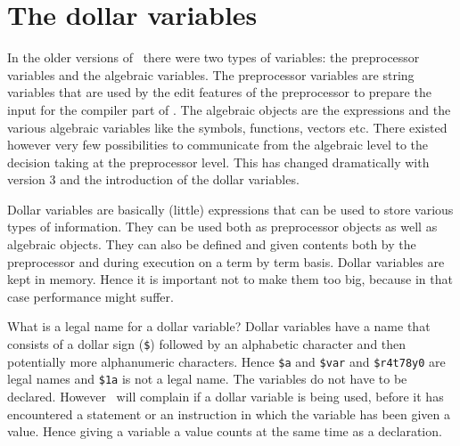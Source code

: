 
\chapter{The dollar variables}
\label{dollars}

In the older versions of \FORM\ there were two types of variables: the 
preprocessor variables and the algebraic 
variables. The preprocessor 
variables are string variables that are used by the edit features of the 
preprocessor to prepare the input for the compiler part of \FORM\@. The 
algebraic objects are the expressions and the various algebraic variables 
like the symbols, functions, vectors etc. There existed however very few 
possibilities to communicate from the algebraic level to the decision 
taking at the preprocessor level. This has changed dramatically with 
version 3 and the introduction of the dollar 
variables.

Dollar variables are basically (little) expressions that can be used to 
store various types of information. They can be used both as preprocessor 
objects as well as algebraic objects. They can also be defined and given 
contents both by the preprocessor and during execution on a term by term 
basis. Dollar variables are kept in memory. Hence it is important not to 
make them too big, because in that case performance might suffer.

What is a legal name for a dollar variable?
Dollar variables have a name that consists of a dollar sign (\verb:$:) 
followed by an alphabetic character and then potentially more alphanumeric 
characters. Hence \verb:$a: and \verb:$var: and \verb:$r4t78y0: are legal 
names and \verb:$1a: is not a legal name. The variables do not have to be 
declared. However \FORM\ will complain if a dollar variable is being used, 
before it has encountered a statement or an instruction in which the 
variable has been given a value. Hence giving a variable a value counts at 
the same time as a declaration.

